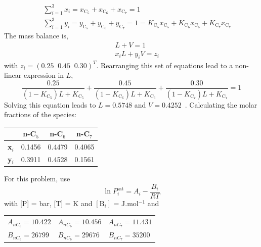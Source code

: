 \documentclass[calculator,steamtables,allquestions,datasheet,resit,solutions]{exam_newMarcus2}
\newcommand{\frc}{\displaystyle\frac}
\begin{document}
\begin{question}
\begin{enumerate}[(a)]
{\begin{eqnarray}
&& \sum\limits_{i=1}^{3}x_{i} = x_{\text{C}_{5}} + x_{\text{C}_{6}} + x_{\text{C}_{7}} = 1  \nonumber \\
&& \sum\limits_{i=1}^{3}y_{i} = y_{\text{C}_{5}} + y_{\text{C}_{6}} + y_{\text{C}_{7}} = 1  = K_{\text{C}_{5}}x_{\text{C}_{5}} + K_{\text{C}_{6}}x_{\text{C}_{6}} + K_{\text{C}_{7}}x_{\text{C}_{7}} \nonumber
\end{eqnarray}
The mass balance is,~
\begin{eqnarray}
&& L + V = 1 \nonumber \\
&& x_{i}L + y_{i}V = z_{i} \nonumber 
\end{eqnarray}
with $z_{i}=\left(0.25\;\;0.45\;\;0.30\right)^{T}$. Rearranging this set of equations lead to a non-linear expression in $L$,~
\begin{displaymath}
\frc{0.25}{\left(1-K_{\text{C}_{5}}\right)L+K_{\text{C}_{5}}} + \frc{0.45}{\left(1-K_{\text{C}_{6}}\right)L+K_{\text{C}_{6}}} +  \frc{0.30}{\left(1-K_{\text{C}_{7}}\right)L+K_{\text{C}_{7}}} = 1 
\end{displaymath}
Solving this equation leads to $L=0.5748$ and $V=0.4252$~. Calculating the molar fractions of the species:~
\begin{center}
\begin{tabular}{c c c c}
\hline
                 & {\bf n-C$_{5}$} &  {\bf n-C$_{6}$} &  {\bf n-C$_{7}$} \\
\hline
  {\bf x$_{i}$}   & 0.1456         &  0.4479         & 0.4065    \\
  {\bf y$_{i}$}   &  0.3911        &  0.4528         & 0.1561    \\
\hline
\end{tabular} 
\end{center}}

%
\end{enumerate}

For this problem, use 
\begin{displaymath}
   \ln P_{i}^{\text{sat}} = A_{i} - \frc{B_{i}}{RT}
\end{displaymath} 
with [P] = bar, [T] = K and $\left[\text{B}_{i}\right]$ = J.mol$^{-1}$ and
    \begin{center}
       \begin{tabular}{l l l} 
          $A_{nC_{5}}=10.422$ & $A_{nC_{6}}=10.456$ & $A_{nC_{7}}=11.431$ \\
          $B_{nC_{5}}=26799$  & $B_{nC_{6}}=29676$  & $B_{nC_{7}}=35200$  
       \end{tabular}
    \end{center}
%
\end{question}
\end{document}
